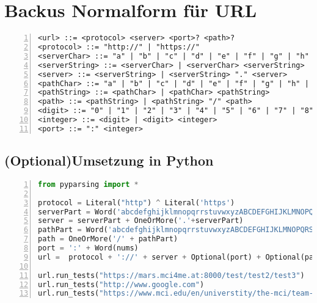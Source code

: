 \documentclass[12pt]{article}
\begin{document}
\section{Backus Normalform für URL}
\begin{lstlisting}[caption={BNF für Email adressen},frame=single, numbers=left]
<url> ::= <protocol> <server> <port>? <path>?
<protocol> ::= "http://" | "https://"
<serverChar> ::= "a" | "b" | "c" | "d" | "e" | "f" | "g" | "h" | "i" | "j" | "k" | "l" | "m" | "n" | "o" | "p" | "q" | "r" | "s" | "t" | "u" | "v" | "w" | "x" | "y" | "z" | "A" | "B" | "C" | "D" | "E" | "F" | "G" | "H" | "I" | "J" | "K" | "L" | "M" | "N" | "O" | "P" | "Q" | "R" | "S" | "T" | "U" | "V" | "W" | "X" | "Y" | "Z" | "0" | "1" | "2" | "3" | "4" | "5" | "6" | "7" | "8" | "9"
<serverString> ::= <serverChar> | <serverChar> <serverString>
<server> ::= <serverString> | <serverString> "." <server>
<pathChar> ::= "a" | "b" | "c" | "d" | "e" | "f" | "g" | "h" | "i" | "j" | "k" | "l" | "m" | "n" | "o" | "p" | "q" | "r" | "s" | "t" | "u" | "v" | "w" | "x" | "y" | "z" | "A" | "B" | "C" | "D" | "E" | "F" | "G" | "H" | "I" | "J" | "K" | "L" | "M" | "N" | "O" | "P" | "Q" | "R" | "S" | "T" | "U" | "V" | "W" | "X" | "Y" | "Z" | "0" | "1" | "2" | "3" | "4" | "5" | "6" | "7" | "8" | "9" | "-"
<pathString> ::= <pathChar> | <pathChar> <pathString>
<path> ::= <pathString> | <pathString> "/" <path>
<digit> ::= "0" | "1" | "2" | "3" | "4" | "5" | "6" | "7" | "8" | "9"
<integer> ::= <digit> | <digit> <integer>
<port> ::= ":" <integer>
\end{lstlisting}
\subsection{(Optional)Umsetzung in Python}
\begin{lstlisting}[caption={Umsetzung der obigen BNF in Python},language=Python,frame=single, numbers=left, breaklines=true]
from pyparsing import *

protocol = Literal("http") ^ Literal('https')
serverPart = Word('abcdefghijklmnopqrrstuvwxyzABCDEFGHIJKLMNOPQRSTUVWXYZ0123456789')
server = serverPart + OneOrMore('.'+serverPart)
pathPart = Word('abcdefghijklmnopqrrstuvwxyzABCDEFGHIJKLMNOPQRSTUVWXYZ0123456789-')
path = OneOrMore('/' + pathPart)
port = ':' + Word(nums)
url =  protocol + '://' + server + Optional(port) + Optional(path)

url.run_tests("https://mars.mci4me.at:8000/test/test2/test3")
url.run_tests("http://www.google.com")
url.run_tests("https://www.mci.edu/en/universtity/the-mci/team-faculty")
\end{lstlisting}
\end{document}
